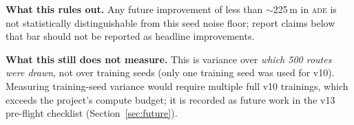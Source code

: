 \documentclass[11pt,a4paper]{article}
\newcommand{\ade}{\textsc{ade}}
\begin{document}
\textbf{What this rules out.}
Any future improvement of less than $\sim$225\,m in \ade{} is not
statistically distinguishable from this seed noise floor; report claims
below that bar should not be reported as headline improvements.

\textbf{What this still does not measure.}
This is variance over \emph{which 500 routes were drawn}, not over training
seeds (only one training seed was used for v10).
Measuring training-seed variance would require multiple full v10 trainings,
which exceeds the project's compute budget; it is recorded as future work
in the v13 pre-flight checklist (Section~\ref{sec:future}).
\end{document}
